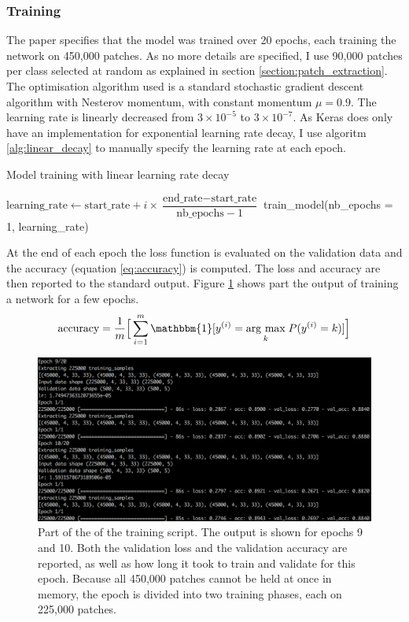 \documentclass[12pt,a4paper,twoside,openright]{report}
\newcommand{\argmax}[1]{\underset{#1}{\operatorname{arg}\,\operatorname{max}}\;} %
\begin{document}
\subsubsection{Training}
The paper specifies that the model was trained over 20 epochs, each training the network on 450,000 patches. As no more details are specified, I use 90,000 patches per class selected at random as explained in section \ref{section:patch_extraction}. The optimisation algorithm used is a standard stochastic gradient descent algorithm with Nesterov momentum, with constant momentum $\mu = 0.9$. The learning rate is linearly decreased from $3 \times 10^{-5}$ to $3 \times 10^{-7}$. As Keras does only have an implementation for exponential learning rate decay, I use algoritm \ref{alg:linear_decay} to manually specify the learning rate at each epoch.

\begin{algorithm}
\caption{Model training with linear learning rate decay}
\label{alg:linear_decay}
\begin{algorithmic}[1]
	\State $\text{learning\_rate} \gets \text{start\_rate} + i \times \dfrac{\text{end\_rate} - \text{start\_rate} }{ \text{nb\_epochs} - 1 }$
	\State train\_model(nb\_epochs = 1, learning\_rate)
\EndFor
\end{algorithmic}
\end{algorithm}

At the end of each epoch the loss function is evaluated on the validation data and the accuracy (equation \ref{eq:accuracy}) is computed. The loss and accuracy are then reported to the standard output. Figure \ref{fig:training_output} shows part the output of training a network for a few epochs.
\begin{equation}
	\label{eq:accuracy}
		\text{accuracy} = 
	\frac{1}{m}\Big[\sum_{i=1}^m\mathbbm{1}[y^{(i)} = \argmax{k}P(y^{(i)}=k)]\Big]
\end{equation}
\begin{figure}
	\centering
	\includegraphics[width=\textwidth]{training_output}
	\caption[Part of the output of the training script]{Part of the of the training script. The output is shown for epochs 9 and 10. Both the validation loss and the validation accuracy are reported, as well as how long it took to train and validate for this epoch. Because all 450,000 patches cannot be held at once in memory, the epoch is divided into two training phases, each on 225,000 patches.}
	\label{fig:training_output}
\end{figure}
\end{document}
